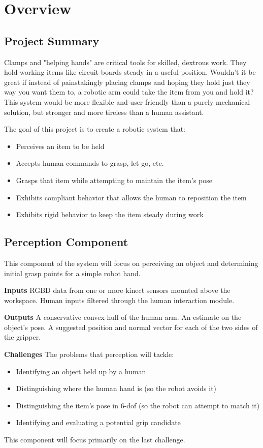 \documentclass[10pt]{article}
\begin{document}
\section{Overview} \label{sec:overview}
\subsection*{Project Summary}
\par Clamps and "helping hands" are critical tools for skilled, dextrous work. They hold working items like circuit boards steady in a useful position. Wouldn't it be great if instead of painstakingly placing clamps and hoping they hold just they way you want them to, a robotic arm could take the item from you and hold it? This system would be more flexible and user friendly than a purely mechanical solution, but stronger and more tireless than a human assistant.
\par The goal of this project is to create a robotic system that:
\begin{itemize}


\item Perceives an item to be held
\item Accepts human commands to grasp, let go, etc.
\item Grasps that item while attempting to maintain the item's pose
\item Exhibits compliant behavior that allows the human to reposition the item 
\item Exhibits rigid behavior to keep the item steady during work
\end{itemize}
\subsection*{Perception Component}
This component of the system will focus on perceiving an object and determining initial grasp points for a simple robot hand. 
\par \textbf{Inputs} RGBD data from one or more kinect sensors mounted above the workspace. Human inputs filtered through the human interaction module.
\par \textbf{Outputs} A conservative convex hull of the human arm. An estimate on the object's pose. A suggested position and normal vector for each of the two sides of the gripper.
\par \textbf{Challenges} The problems that perception will tackle:
\begin{itemize}
\item Identifying an object held up by a human
\item Distinguishing where the human hand is (so the robot avoids it)
\item Distinguishing the item's pose in 6-dof (so the robot can attempt to match it)
\item Identifying and evaluating a potential grip candidate
\end{itemize}
This component will focus primarily on the last challenge.
\end{document}
